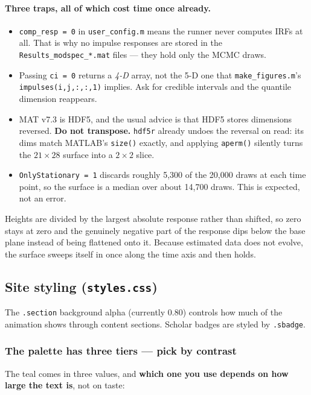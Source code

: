\documentclass[11pt,a4paper]{article}
\newcommand{\file}[1]{\texttt{#1}}
\begin{document}
\paragraph{Three traps, all of which cost time once already.}
\begin{itemize}[itemsep=2pt]
\item \texttt{comp\_resp = 0} in \file{user\_config.m} means the runner never
      computes IRFs at all. That is why no impulse responses are stored in
      the \file{Results\_modspec\_*.mat} files --- they hold only the MCMC
      draws.
\item Passing \texttt{ci = 0} returns a \emph{4-D} array, not the 5-D one
      that \file{make\_figures.m}'s \texttt{impulses(i,j,:,:,1)} implies.
      Ask for credible intervals and the quantile dimension reappears.
\item MAT v7.3 is HDF5, and the usual advice is that HDF5 stores dimensions
      reversed. \textbf{Do not transpose.} \texttt{hdf5r} already undoes the
      reversal on read: its dims match MATLAB's \texttt{size()} exactly, and
      applying \texttt{aperm()} silently turns the $21\times28$ surface into
      a $2\times2$ slice.
\item \texttt{OnlyStationary = 1} discards roughly 5{,}300 of the 20{,}000
      draws at each time point, so the surface is a median over about
      14{,}700 draws. This is expected, not an error.
\end{itemize}

Heights are divided by the largest absolute response rather than shifted, so
zero stays at zero and the genuinely negative part of the response dips
below the base plane instead of being flattened onto it. Because estimated
data does not evolve, the surface sweeps itself in once along the time axis
and then holds.

\subsection{Site styling (\file{styles.css})}
The \texttt{.section} background alpha (currently 0.80) controls how much
of the animation shows through content sections. Scholar badges are styled
by \texttt{.sbadge}.

\subsubsection*{The palette has three tiers --- pick by contrast}

The teal comes in three values, and \textbf{which one you use depends on
how large the text is}, not on taste:
\end{document}
